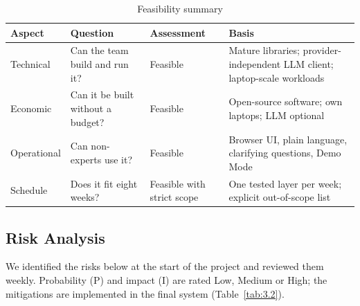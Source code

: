 \begin{table}[H]
\centering
\linespread{1}\small
\setlength{\tabcolsep}{4pt}
\caption{Feasibility summary}\label{tab:3.1}
\begin{tabular}{|>{\raggedright\arraybackslash\hspace{0pt}}p{}|>{\raggedright\arraybackslash\hspace{0pt}}p{}|>{\raggedright\arraybackslash\hspace{0pt}}p{}|>{\raggedright\arraybackslash\hspace{0pt}}p{}|}
\hline
\rowcolor{tableheader}\textbf{Aspect} & \textbf{Question} & \textbf{Assessment} & \textbf{Basis} \\
\hline
Technical & Can the team build and run it? & Feasible & Mature libraries; provider-independent LLM client; laptop-scale workloads \\ \hline
Economic & Can it be built without a budget? & Feasible & Open-source software; own laptops; LLM optional \\ \hline
Operational & Can non-experts use it? & Feasible & Browser UI, plain language, clarifying questions, Demo Mode \\ \hline
Schedule & Does it fit eight weeks? & Feasible with strict scope & One tested layer per week; explicit out-of-scope list \\ \hline
\end{tabular}
\end{table}

\subsection{Risk Analysis}\label{sec:3.1.2}

We identified the risks below at the start of the project and reviewed them weekly. Probability (P) and impact (I) are rated Low, Medium or High; the mitigations are implemented in the final system (Table~\ref{tab:3.2}).

